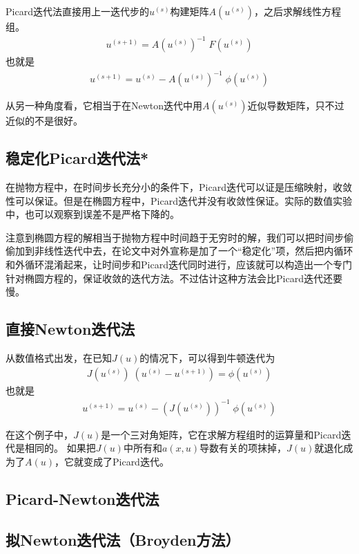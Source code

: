 \documentclass[12pt,a4paper]{article}
\begin{document}
Picard迭代法直接用上一迭代步的$u^{(s)}$构建矩阵$A(u^{(s)})$，之后求解线性方程组。
\begin{align*}
u^{(s+1)} = {A(u^{(s)})}^{-1} \; F(u^{(s)})
\end{align*}
也就是
\begin{align*}
u^{(s+1)} = u^{(s)} - {A(u^{(s)})}^{-1} \; \phi(u^{(s)})
\end{align*}

从另一种角度看，它相当于在Newton迭代中用$A(u^{(s)})$近似导数矩阵，只不过近似的不是很好。

\subsection*{稳定化Picard迭代法*}

在抛物方程中，在时间步长充分小的条件下，Picard迭代可以证是压缩映射，收敛性可以保证。但是在椭圆方程中，Picard迭代并没有收敛性保证。实际的数值实验中，也可以观察到误差不是严格下降的。

注意到椭圆方程的解相当于抛物方程中时间趋于无穷时的解，我们可以把时间步偷偷加到非线性迭代中去，在论文中对外宣称是加了一个“稳定化”项，然后把内循环和外循环混淆起来，让时间步和Picard迭代同时进行，应该就可以构造出一个专门针对椭圆方程的，保证收敛的迭代方法。不过估计这种方法会比Picard迭代还要慢。

\subsection*{直接Newton迭代法}

从数值格式出发，在已知$J(u)$的情况下，可以得到牛顿迭代为
\begin{align*}
J(u^{(s)}) \; (u^{(s)} - u^{(s+1)}) = \phi(u^{(s)})
\end{align*}
也就是
\begin{align*}
u^{(s+1)} = u^{(s)} - (J(u^{(s)}))^{-1} \; \phi(u^{(s)})
\end{align*}

在这个例子中，$J(u)$是一个三对角矩阵，它在求解方程组时的运算量和Picard迭代是相同的。
如果把$J(u)$中所有和$a(x,u)$导数有关的项抹掉，$J(u)$就退化成为了$A(u)$，它就变成了Picard迭代。

\subsection*{Picard-Newton迭代法}

\subsection*{拟Newton迭代法（Broyden方法）}
\end{document}
